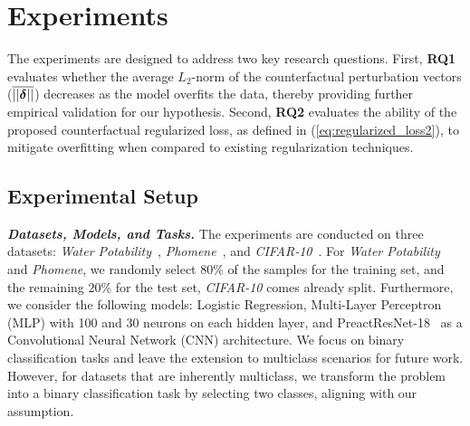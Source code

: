 \section{Experiments}
\label{sec:experiments}
The experiments are designed to address two key research questions.
First, \textbf{RQ1} evaluates whether the average $L_2$-norm of the counterfactual perturbation vectors ($\overline{||\boldsymbol{\delta}||}$) decreases as the model overfits the data, thereby providing further empirical validation for our hypothesis.
Second, \textbf{RQ2} evaluates the ability of the proposed counterfactual regularized loss, as defined in (\ref{eq:regularized_loss2}), to mitigate overfitting when compared to existing regularization techniques.


\subsection{Experimental Setup}
\textbf{\textit{Datasets, Models, and Tasks.}}
The experiments are conducted on three datasets: \textit{Water Potability}~\cite{kadiwal2020waterpotability}, \textit{Phomene}~\cite{phomene}, and \textit{CIFAR-10}~\cite{krizhevsky2009learning}. For \textit{Water Potability} and \textit{Phomene}, we randomly select $80\%$ of the samples for the training set, and the remaining $20\%$ for the test set, \textit{CIFAR-10} comes already split. Furthermore, we consider the following models: Logistic Regression, Multi-Layer Perceptron (MLP) with 100 and 30 neurons on each hidden layer, and PreactResNet-18~\cite{he2016cvecvv} as a Convolutional Neural Network (CNN) architecture.
We focus on binary classification tasks and leave the extension to multiclass scenarios for future work. However, for datasets that are inherently multiclass, we transform the problem into a binary classification task by selecting two classes, aligning with our assumption.

